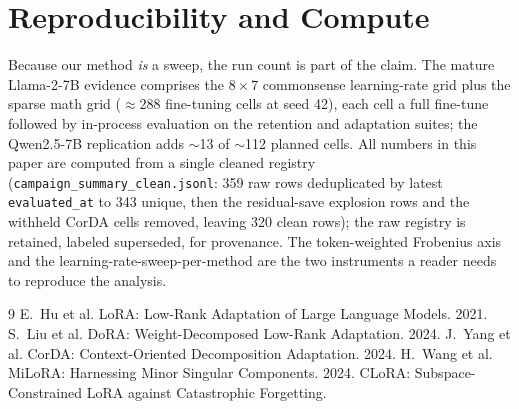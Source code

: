 \documentclass[11pt]{article}
\begin{document}
\section*{Reproducibility and Compute}
Because our method \emph{is} a sweep, the run count is part of the claim. The mature
Llama-2-7B evidence comprises the $8\times 7$ commonsense learning-rate grid plus the
sparse math grid ($\approx\!288$ fine-tuning cells at seed 42), each cell a full
fine-tune followed by in-process evaluation on the retention and adaptation suites; the
Qwen2.5-7B replication adds $\sim$13 of $\sim$112 planned cells.
All numbers in this paper are computed from a single cleaned registry
(\texttt{campaign\_summary\_clean.jsonl}: 359 raw rows deduplicated by latest
\texttt{evaluated\_at} to 343 unique, then the residual-save explosion rows and the
withheld CorDA cells removed, leaving 320 clean rows); the raw registry is retained,
labeled superseded, for provenance. The token-weighted Frobenius axis and the
learning-rate-sweep-per-method are the two instruments a reader needs to reproduce the
analysis.


\begin{thebibliography}{9}
 E.~Hu et al. LoRA: Low-Rank Adaptation of Large Language Models. 2021. %
 S.~Liu et al. DoRA: Weight-Decomposed Low-Rank Adaptation. 2024. %
 J.~Yang et al. CorDA: Context-Oriented Decomposition Adaptation. 2024. %
 H.~Wang et al. MiLoRA: Harnessing Minor Singular Components. 2024. %
 CLoRA: Subspace-Constrained LoRA against Catastrophic Forgetting. %
\end{thebibliography}
\end{document}
